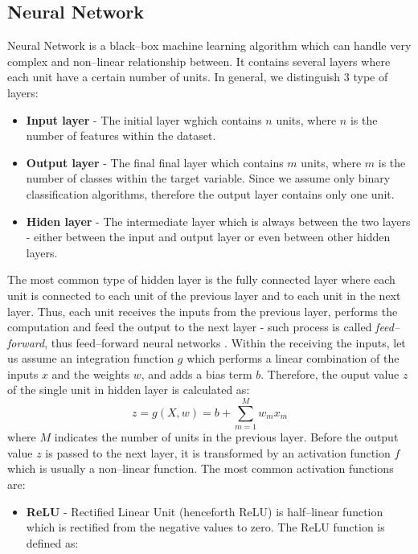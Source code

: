 \subsection{Neural Network}
Neural Network is a black--box machine learning algorithm which can handle very complex and non--linear relationship between. It contains several layers where each unit have a certain number of units. In general, we distinguish 3 type of layers:
\begin{itemize}\setlength\itemsep{0em}
    \item \textbf{Input layer} - The initial layer wghich contains $n$ units, where $n$ is the number of features within the dataset.
    \item \textbf{Output layer} - The final final layer which contains $m$ units, where $m$ is the number of classes within the target variable. Since we assume only binary classification algorithms, therefore the output layer contains only one unit.
    \item \textbf{Hiden layer} - The intermediate layer which is always between the two layers - either between the input and output layer or even between other hidden layers.
    \end{itemize}
The most common type of hidden layer is the fully connected layer where each unit is connected to each unit of the previous layer and to each unit in the next layer.
Thus, each unit receives the inputs from the previous layer, performs the computation and feed the output to the next layer - such process is called \textit{feed--forward}, thus feed--forward neural networks \citep{charu2018neural}.
Within the receiving the inputs, let us assume an integration function $g$ which performs a linear combination of the inputs $x$ and the weights $w$, and adds a bias term $b$.
Therefore, the ouput value $z$ of the single unit in hidden layer is calculated as:
\begin{equation}
    z = g\left(X,w\right)= b + \sum_{m=1}^{M} w_m x_m
\end{equation}
where $M$ indicates the number of units in the previous layer.
Before the output value $z$ is passed to the next layer, it is transformed by an activation function $f$ which is usually a non--linear function. The most common activation functions are:
\begin{itemize}\setlength\itemsep{0cm}
\item \textbf{ReLU} - Rectified Linear Unit (henceforth ReLU) is half--linear function which is rectified from the negative values to zero. The ReLU function is defined as:
\end{itemize}
